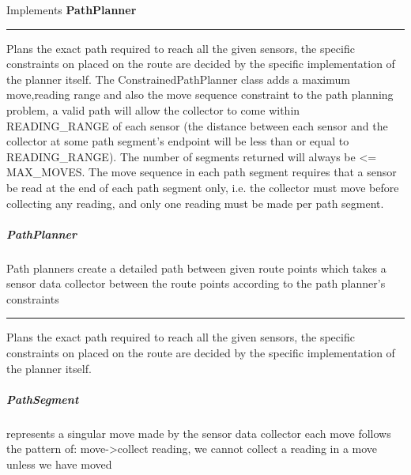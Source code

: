 Implements \textbf{ PathPlanner }
\hrule
\begin{mitem}
\scriptsize
	{}
	{Plans the exact path required to reach all the given sensors, the specific constraints on placed on the route are decided\newline%
 by the specific implementation of the planner itself.\newline%
 The ConstrainedPathPlanner class adds a maximum move,reading range and also the move sequence constraint to the path planning problem, a valid path will allow the collector\newline%
 to come within READING\_RANGE of each sensor (the distance between each sensor and the collector at some path segment's endpoint will be less than or equal to READING\_RANGE).\newline%
 The number of segments returned will always be <= MAX\_MOVES. The move sequence in each path segment requires that a sensor be read at the end of each path segment only, i.e. the collector must move before collecting\newline%
 any reading, and only one reading must be made per path segment.}
\end{mitem}

\subparagraph{ PathPlanner } Path planners create a detailed path between given route points which takes a sensor data collector 
 between the route points according to the path planner's constraints
 
\hrule
\begin{mitem}
\scriptsize
	{Plans the exact path required to reach all the given sensors, the specific constraints on placed on the route are decided\newline%
 by the specific implementation of the planner itself.}
\end{mitem}

\subparagraph{ PathSegment } represents a singular move made by the sensor data collector
 each move follows the pattern of: move->collect reading, 
 we cannot collect a reading in a move unless we have moved
 
